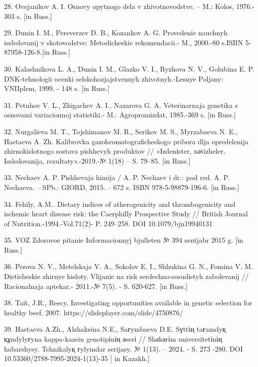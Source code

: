 28. Ovsjanikov A. I. Osnovy opytnogo dela v zhivotnovodstve. -- M.:
Kolos, 1976.- 303 s. {[}in Russ.{]}

29. Dunin I. M., Pereverzev D. B., Kozankov A. G. Provedenie nauchnyh
issledovanij v skotovodstve: Metodicheskie rekomendacii.- M., 2000.-80
s.ISBN 5-87958-126-8.{[}in Russ.{]}

30. Kalashnikova L. A., Dunin I. M., Glazko V. I., Ryzhova N. V.,
Golubina E. P. DNK-tehnologii ocenki
sel\textquotesingle skohozjajstvennyh zhivotnyh.-Lesnye Poljany:
VNIIplem, 1999. - 148 s. {[}in Russ.{]}

31. Petuhov V. L., Zhigachev A. I., Nazarova G. A. Veterinarnaja
genetika s osnovami variacionnoj statistiki.- M.: Agropromizdat,
1985.-369 s. {[}in Russ.{]}

32. Nurgalieva M. T., Tojshimanov M. R., Serikov M. S., Myrzabaeva N.
E., Hastaeva A. Zh. Kalibrovka gazohromatograficheskogo pribora dlja
opredelenija zhirnokislotnogo sostava pishhevyh produktov //
«Іzdenіster, nәtizheler. Issledovanija,
rezul\textquotesingle taty».-2019.-№ 1(18) -- S. 79--85. {[}in Russ.{]}

33. Nechaev A. P. Pishhevaja himija / A. P. Nechaev i dr.: pod red. A.
P. Nechaeva. -- SPb.: GIORD, 2015. -- 672 s. ISBN 978-5-98879-196-6.
{[}in Russ.{]}

34. Fehily, A.M.. Dietary indices of atherogenicity and thrombogenicity
and ischemic heart disease risk: the Caerphilly Prospective Study //
British Journal of Nutrition.-1994.-Vol.71(2)- P. 249--258. DOI
10.1079/bjn19940131

35. VOZ Zdorovoe pitanie Informacionnyj bjulleten\textquotesingle{} №
394 sentjabr\textquotesingle{} 2015 g. {[}in Russ.{]}

36. Perova N. V., Metel\textquotesingle skaja V. A., Sokolov E. I.,
Shhukina G. N., Fomina V. M. Dieticheskie zhirnye kisloty. Vlijanie na
risk serdechno-sosudistyh zabolevanij // Racional\textquotesingle naja
aptekar\textquotesingle.- 2011.-№ 7(5). - S. 620-627. {[}in Russ.{]}

38. Tait, J.R., Reecy, Investigating opportunities available in genetic
selection for healthy beef. 2007. https://slideplayer.com/slide/4750876/

39. Hastaeva A.Zh., Al\textquotesingle zhaksina N.E., Saғymbaeva D.E.
Sүttің taғamdyқ құndylyғyna kappa-kazein genotipіnің әserі // Shәkәrіm
universitetіnің habarshysy. Tehnikalyқ ғylymdar serijasy. № 1(13). --
2024. - S. 273 -280. DOI 10.53360/2788-7995-2024-1(13)-35 {[} in
Kazakh.{]}

